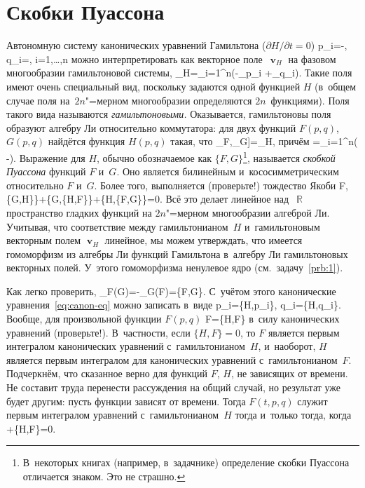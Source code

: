 \documentclass[a4paper,11pt]{article}
\def\[#1\]{\begin{align*}#1\end{align*}}
\newcommand\eqtag[1]{\refstepcounter{equation}\tag{\theequation}\label{#1}}
\newcommand\slashfrac[2]{{#1/#2}}
\theoremstyle{definition}
\begin{document}
\section{Скобки Пуассона}

Автономную систему канонических уравнений Гамильтона ($\slashfrac{\partial
H}{\partial t}=0$)
	\[
	\dot p_i=-,
	\quad
	\dot q_i=,
	\quad
	i=1,\ldots,n
	\eqtag{eq:canon-eq}
	\]
можно интерпретировать как векторное поле~$\mbfv_H$ на фазовом многообразии
гамильтоновой системы,
	\[
	\mbfv_H=\sum_{i=1}^n\left(-\partial_{p_i}
		+\partial_{q_i}\right).
	\]
Такие поля имеют очень специальный вид, поскольку задаются одной функцией $H$
(в~общем случае поля на~$2n$"=мерном многообразии определяются $2n$~функциями).
Поля такого вида называются \emph{гамильтоновыми.} Оказывается, гамильтоновы
поля образуют алгебру Ли относительно коммутатора: для двух функций $F(p,q)$,
$G(p,q)$ найдётся функция $H(p,q)$ такая, что
	\[
	[\mbfv_F,\mbfv_G]=\mbfv_H,
	\]
причём
	\[
	H=\sum_{i=1}^n\left(\frac{\partial G}{\partial q_i}
		-\right).
	\]
Выражение для $H$, обычно обозначаемое как $\{F,G\}$\footnote{В~некоторых
книгах (например, в~задачнике) определение скобки Пуассона отличается знаком.
Это не страшно.}, называется \emph{скобкой Пуассона\/} функций $F$ и~$G$. Оно
является билинейным и~кососимметрическим относительно $F$ и~$G$. Более того,
выполняется (проверьте!) тождество Якоби
	\[
	\{F,\{G,H\}\}+\{G,\{H,F\}\}+\{H,\{F,G\}\}=0.
	\]
Всё это делает линейное над~$\BbbR$ пространство гладких функций на
$2n$"=мерном многообразии алгеброй Ли. Учитывая, что соответствие между
гамильтонианом~$H$ и~гамильтоновым векторным полем $\mbfv_H$ линейное, мы можем
утверждать, что имеется гомоморфизм из алгебры Ли функций Гамильтона в~алгебру
Ли гамильтоновых векторных полей. У~этого гомоморфизма ненулевое ядро
(см.~задачу~\ref{prb:1}).

Как легко проверить,
	\[
	\mbfv_F(G)=-\mbfv_G(F)=\{F,G\}.
	\]
С~учётом этого канонические уравнения~\ref{eq:canon-eq} можно записать в~виде
	\[
	\dot p_i=\{H,p_i\},
	\quad
	\dot q_i=\{H,q_i\}.
	\]
Вообще, для произвольной функции $F(p,q)$
	\[
	\dot F=\{H,F\}
	\]
в~силу канонических уравнений (проверьте!). В~частности, если $\{H,F\}=0$, то
$F$ является первым интегралом канонических уравнений с~гамильтонианом~$H$,
и~наоборот, $H$ является первым интегралом для канонических уравнений
с~гамильтонианом~$F$. Подчеркнём, что сказанное верно для функций $F$, $H$, не
зависящих от времени. Не составит труда перенести рассуждения на общий случай,
но результат уже будет другим: пусть функции зависят от времени. Тогда
$F(t,p,q)$ служит первым интегралом уравнений с~гамильтонианом~$H$ тогда
и~только тогда, когда
	\[
	\frac{\partial F}{\partial t}+\{H,F\}=0.
	\]
\end{document}
